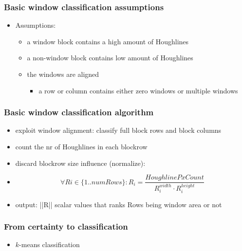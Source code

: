 \documentclass{beamer}
\begin{document}
\frame
{
	\frametitle{Basic window classification assumptions}
	\begin{itemize}
	\item <+-| alert@+> Assumptions:
		\begin{itemize}
		\item <+-| alert@+> a window block contains a high amount of Houghlines
		\item <+-| alert@+> a non-window block contains low amount of Houghlines
		\item <+-| alert@+> the windows are aligned 
			\begin{itemize}
			\item <+-| alert@+> a row or column contains either zero windows or multiple windows 
			\end{itemize}
		\end{itemize}
	\end{itemize}
}

\frame
{
	\frametitle{Basic window classification algorithm}
	\begin{itemize}
	\item <+-| alert@+> exploit window alignment: classify full block rows and block columns
	\item <+-| alert@+> count the nr of Houghlines in each blockrow
	\item <+-| alert@+> discard blockrow size influence (normalize):
	\item <+-| alert@+> \[\forall Ri\in \{1..numRows\} : R_i = \frac{HoughlinePxCount}{R_i^{width} \cdot R_i^{height}}\]
	\item <+-| alert@+> output: ||R|| scalar values that ranks Rows being window area or not
	\end{itemize}
	

}

\frame
{
}

\frame
{
}

\frame
{
}



\frame
{
	\frametitle{From certainty to classification}
	\begin{itemize}
	\item <+-| alert@+> $k$-means classification

	\end{itemize}
}
\end{document}
